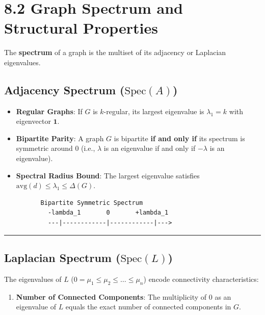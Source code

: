 \documentclass[
]{book}
\providecommand{\tightlist}{%
  \setlength{\itemsep}{0pt}\setlength{\parskip}{0pt}}
\theoremstyle{definition}
\theoremstyle{definition}
\theoremstyle{definition}
\theoremstyle{definition}
\theoremstyle{remark}
\begin{document}
\section{8.2 Graph Spectrum and Structural Properties}\label{graph-spectrum-and-structural-properties}

The \textbf{spectrum} of a graph is the multiset of its adjacency or Laplacian eigenvalues.

\subsection{\texorpdfstring{Adjacency Spectrum (\(\text{Spec}(A)\))}{Adjacency Spectrum (\textbackslash text\{Spec\}(A))}}\label{adjacency-spectrum-textspeca}

\begin{itemize}
\tightlist
\item
  \textbf{Regular Graphs}: If \(G\) is \(k\)-regular, its largest eigenvalue is \(\lambda_1 = k\) with eigenvector \(\mathbf{1}\).
\item
  \textbf{Bipartite Parity}: A graph \(G\) is bipartite \textbf{if and only if} its spectrum is symmetric around \(0\) (i.e., \(\lambda\) is an eigenvalue if and only if \(-\lambda\) is an eigenvalue).
\item
  \textbf{Spectral Radius Bound}: The largest eigenvalue satisfies \(\text{avg}(d) \le \lambda_1 \le \Delta(G)\).
\end{itemize}

\begin{verbatim}
          Bipartite Symmetric Spectrum
            -lambda_1       0       +lambda_1
            ---|------------|------------|--->
\end{verbatim}

\begin{center}\rule{0.5\linewidth}{0.5pt}\end{center}

\subsection{\texorpdfstring{Laplacian Spectrum (\(\text{Spec}(L)\))}{Laplacian Spectrum (\textbackslash text\{Spec\}(L))}}\label{laplacian-spectrum-textspecl}

The eigenvalues of \(L\) (\(0 = \mu_1 \le \mu_2 \le \dots \le \mu_n\)) encode connectivity characteristics:

\begin{enumerate}
\def\labelenumi{\arabic{enumi}.}
\tightlist
\item
  \textbf{Number of Connected Components}:
  The multiplicity of \(0\) as an eigenvalue of \(L\) equals the exact number of connected components in \(G\).
\end{enumerate}
\end{document}

